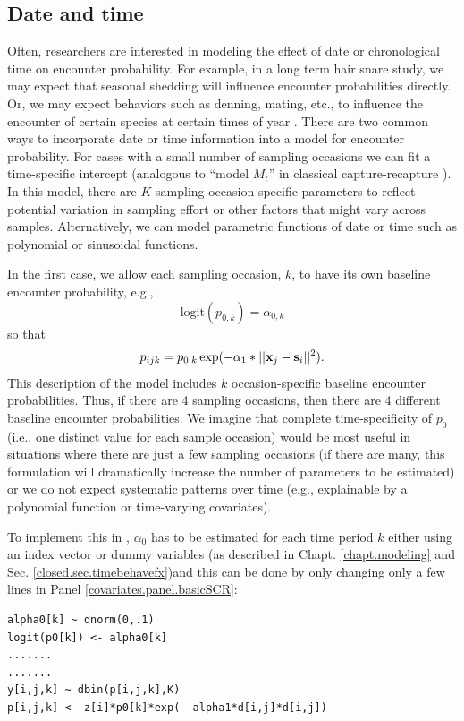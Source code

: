 \subsection{Date and time}

Often, researchers are interested in modeling the effect of date or
chronological time on 
encounter probability. For example, in a long term hair snare study,
we may expect that seasonal shedding \citep{wegan_etal:2012} will
influence encounter probabilities directly. Or, we may expect
behaviors such as denning, mating, etc., to influence the encounter of
certain species at certain times of year \citep{kery_etal:2011}.
There are two common ways to incorporate date or time information into
a model for encounter probability. For cases with a small number of
sampling occasions we can fit a time-specific intercept (analogous to
``model $M_{t}$'' in classical capture-recapture
\citep{otis_etal:1978}). In this model, there are $K$ sampling
occasion-specific parameters to reflect potential variation in
sampling effort or other factors that might vary across samples.
Alternatively, we can model parametric functions of date or time such
as polynomial or sinusoidal functions.

In the first case, we allow each sampling occasion, $k$, to have its
own baseline encounter probability, e.g.,
\[
\mbox{logit}(p_{0,k}) = \alpha_{0,k}
\]
so that
\[
p_{ijk} = p_{0,k} \exp(- \alpha_1*||{\bf x}_{j}-{\bf s}_{i}||^2).
\]
This description of the model includes $k$ occasion-specific baseline
encounter probabilities.  Thus, if there are 4 sampling occasions, then
there are 4 different baseline encounter probabilities.  We imagine
that complete time-specificity of $p_{0}$ 
(i.e., one distinct value for each sample occasion)
would be most useful in situations
where there are just a few sampling occasions (if there are many, this
formulation will dramatically increase the number of parameters to be
estimated) or we do not expect systematic patterns over time (e.g.,
explainable by a polynomial function or time-varying covariates).

To implement this in \jags, $\alpha_0$ has to be
estimated for each time period $k$ either using an index vector or
dummy variables (as described in Chapt. \ref{chapt.modeling} and Sec. 
\ref{closed.sec.timebehavefx})and this can be done by only 
changing only a few lines in Panel \ref{covariates.panel.basicSCR}:
\begin{verbatim}
alpha0[k] ~ dnorm(0,.1)
logit(p0[k]) <- alpha0[k]
.......
.......
y[i,j,k] ~ dbin(p[i,j,k],K)
p[i,j,k] <- z[i]*p0[k]*exp(- alpha1*d[i,j]*d[i,j])
\end{verbatim}

